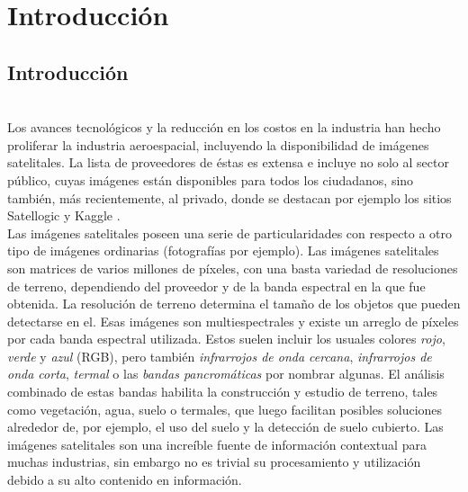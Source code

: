 \chapter{Introducción}
\label{Introducción}
\section{Introducción}
\\
Los avances tecnológicos y la reducción en los costos en la industria han hecho proliferar la industria aeroespacial, incluyendo la disponibilidad de imágenes satelitales. La lista de proveedores de éstas es extensa e incluye no solo al sector público, cuyas imágenes están disponibles para todos los ciudadanos, sino también, más recientemente, al privado, donde se destacan por ejemplo los sitios Satellogic \cite{satellogic} y Kaggle \cite{kaggle}.
\\

Las imágenes satelitales poseen una serie de particularidades con respecto a otro tipo de imágenes ordinarias (fotografías por ejemplo). Las imágenes satelitales son matrices de varios millones de píxeles, con una basta variedad de resoluciones de terreno, dependiendo del proveedor y de la banda espectral en la que fue obtenida. La resolución de terreno determina el tamaño de los objetos que pueden detectarse en el. Esas imágenes son multiespectrales y existe un arreglo de píxeles por cada banda espectral utilizada. Estos suelen incluir los usuales colores \textit{rojo}, \textit{verde} y \textit{azul} (RGB), pero también \textit{infrarrojos de onda cercana}, \textit{infrarrojos de onda corta}, \textit{termal} o las \textit{bandas pancromáticas} por nombrar algunas. El análisis combinado de estas bandas habilita la construcción y estudio de terreno, tales como vegetación, agua, suelo o termales, que luego facilitan posibles soluciones alrededor de, por ejemplo, el uso del suelo y la detección de suelo cubierto. Las imágenes satelitales son una increíble fuente de información contextual para muchas industrias, sin embargo no es trivial su procesamiento y utilización debido a su alto contenido en información.
\\

